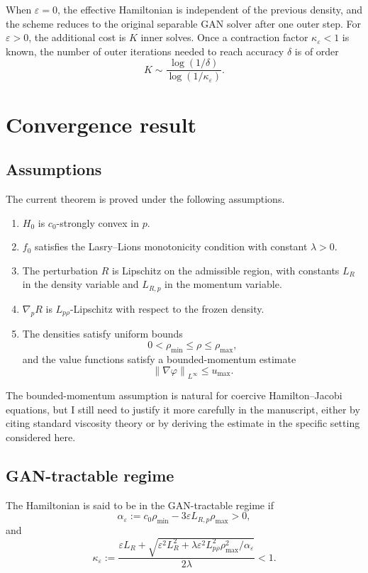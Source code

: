 \documentclass[11pt]{article}
\newcommand{\norm}[1]{\left\lVert #1 \right\rVert}
\newcommand{\eps}{\varepsilon}
\begin{document}
When $\eps=0$, the effective Hamiltonian is independent of the previous density, and the scheme reduces to the original separable GAN solver after one outer step. For $\eps>0$, the additional cost is $K$ inner solves. Once a contraction factor $\kappa_\eps<1$ is known, the number of outer iterations needed to reach accuracy $\delta$ is of order
\[
  K \sim \frac{\log(1/\delta)}{\log(1/\kappa_\eps)}.
\]

\section{Convergence result}

\subsection{Assumptions}

The current theorem is proved under the following assumptions.

\begin{enumerate}[leftmargin=*]
  \item $H_0$ is $c_0$-strongly convex in $p$.
  \item $f_0$ satisfies the Lasry--Lions monotonicity condition with constant $\lambda>0$.
  \item The perturbation $R$ is Lipschitz on the admissible region, with constants $L_R$ in the density variable and $L_{R,p}$ in the momentum variable.
  \item $\nabla_p R$ is $L_{p\rho}$-Lipschitz with respect to the frozen density.
  \item The densities satisfy uniform bounds
  \[
    0<\rho_{\min}\leq \rho \leq \rho_{\max},
  \]
  and the value functions satisfy a bounded-momentum estimate
  \[
    \norm{\nabla\varphi}_{L^\infty}\leq u_{\max}.
  \]
\end{enumerate}

The bounded-momentum assumption is natural for coercive Hamilton--Jacobi equations, but I still need to justify it more carefully in the manuscript, either by citing standard viscosity theory or by deriving the estimate in the specific setting considered here.

\subsection{GAN-tractable regime}

The Hamiltonian is said to be in the GAN-tractable regime if
\[
  \alpha_\eps := c_0\rho_{\min}-3\eps L_{R,p}\rho_{\max}>0,
\]
and
\[
  \kappa_\eps
  :=
  \frac{
  \eps L_R+
  \sqrt{\eps^2L_R^2+
  \lambda\eps^2L_{p\rho}^2\rho_{\max}^2/\alpha_\eps}
  }{2\lambda}
  <1.
\]
\end{document}
